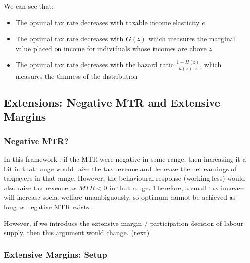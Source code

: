             We can see that:
            \begin{itemize}
                \item The optimal tax rate decreases with taxable income elasticity $e$
                \item The optimal tax rate decreases with $G(z)$ which measures the marginal value placed on income for individuals whose incomes are above $z$
                \item The optimal tax rate decreases with the hazard ratio $\frac{1-H(z)}{h(z) \cdot z}$, which measures the thinness of the distribution
            \end{itemize}

    \subsection{Extensions: Negative MTR and Extensive Margins}

        \subsubsection{Negative MTR?}

            In this framework : if the MTR were negative in some range, then increasing it a bit in that range would raise the tax revenue and decrease the net earnings of taxpayers in that range. However, the behavioural response (working less) would also raise tax revenue as $MTR<0$ in that range. Therefore, a small tax increase will increase social welfare unambiguously, so optimum cannot be achieved as long as negative MTR exists.

            However, if we introduce the extensive margin / participation decision of labour supply, then this argument would change. (next)

        \subsubsection{Extensive Margins: Setup}

